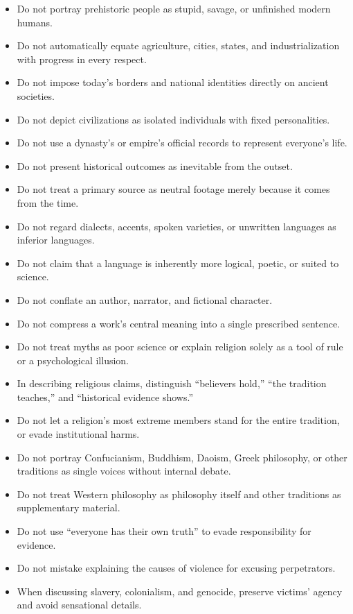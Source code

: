 \begin{itemize}
\item Do not portray prehistoric people as stupid, savage, or unfinished modern humans.
\item Do not automatically equate agriculture, cities, states, and industrialization with progress in every respect.
\item Do not impose today's borders and national identities directly on ancient societies.
\item Do not depict civilizations as isolated individuals with fixed personalities.
\item Do not use a dynasty's or empire's official records to represent everyone's life.
\item Do not present historical outcomes as inevitable from the outset.
\item Do not treat a primary source as neutral footage merely because it comes from the time.
\item Do not regard dialects, accents, spoken varieties, or unwritten languages as inferior languages.
\item Do not claim that a language is inherently more logical, poetic, or suited to science.
\item Do not conflate an author, narrator, and fictional character.
\item Do not compress a work's central meaning into a single prescribed sentence.
\item Do not treat myths as poor science or explain religion solely as a tool of rule or a psychological illusion.
\item In describing religious claims, distinguish ``believers hold,'' ``the tradition teaches,'' and ``historical evidence shows.''
\item Do not let a religion's most extreme members stand for the entire tradition, or evade institutional harms.
\item Do not portray Confucianism, Buddhism, Daoism, Greek philosophy, or other traditions as single voices without internal debate.
\item Do not treat Western philosophy as philosophy itself and other traditions as supplementary material.
\item Do not use ``everyone has their own truth'' to evade responsibility for evidence.
\item Do not mistake explaining the causes of violence for excusing perpetrators.
\item When discussing slavery, colonialism, and genocide, preserve victims' agency and avoid sensational details.

\end{itemize}
